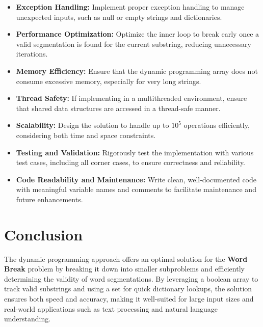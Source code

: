 \begin{itemize}
    \item \textbf{Exception Handling:}  
    Implement proper exception handling to manage unexpected inputs, such as null or empty strings and dictionaries.
    
    \item \textbf{Performance Optimization:}  
    Optimize the inner loop to break early once a valid segmentation is found for the current substring, reducing unnecessary iterations.
    
    \item \textbf{Memory Efficiency:}  
    Ensure that the dynamic programming array does not consume excessive memory, especially for very long strings.
    
    \item \textbf{Thread Safety:}  
    If implementing in a multithreaded environment, ensure that shared data structures are accessed in a thread-safe manner.
    
    \item \textbf{Scalability:}  
    Design the solution to handle up to \(10^5\) operations efficiently, considering both time and space constraints.
    
    \item \textbf{Testing and Validation:}  
    Rigorously test the implementation with various test cases, including all corner cases, to ensure correctness and reliability.
    
    \item \textbf{Code Readability and Maintenance:}  
    Write clean, well-documented code with meaningful variable names and comments to facilitate maintenance and future enhancements.
\end{itemize}

\section*{Conclusion}

The dynamic programming approach offers an optimal solution for the \textbf{Word Break} problem by breaking it down into smaller subproblems and efficiently determining the validity of word segmentations. By leveraging a boolean array to track valid substrings and using a set for quick dictionary lookups, the solution ensures both speed and accuracy, making it well-suited for large input sizes and real-world applications such as text processing and natural language understanding.

\printindex